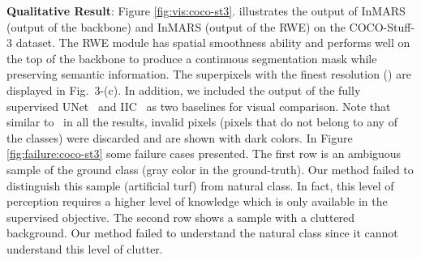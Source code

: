 \documentclass[letterpaper, 10 pt, journal, twoside]{IEEEtran}
\newcommand{\Fig}{Fig.\xspace}
\begin{document}
\textbf{Qualitative Result}: Figure \ref{fig:vis:coco-st3}. illustrates the output of InMARS (output of the backbone) and InMARS (output of the RWE) on the COCO-Stuff-3 dataset. The RWE module has spatial smoothness ability and performs well on the top of the backbone to produce a continuous segmentation mask while preserving semantic information. The superpixels with the finest resolution () are displayed in \Fig~3-(c). In addition, we included the output of the fully supervised UNet~\cite{UNet} and IIC~\cite{IIC} as two baselines for visual comparison. Note that similar to~\cite{IIC, UNet} in all the results, invalid pixels (pixels that do not belong to any of the classes) were discarded and are shown with dark colors. In Figure \ref{fig:failure:coco-st3} some failure cases presented. The first row is an ambiguous sample of the ground class (gray color in the ground-truth). Our method failed to distinguish this sample (artificial turf) from natural class. In fact, this level of perception requires a higher level of knowledge which is only available in the supervised objective. The second row shows a sample with a cluttered background. Our method failed to understand the natural class since it cannot understand this level of clutter.
\end{document}

